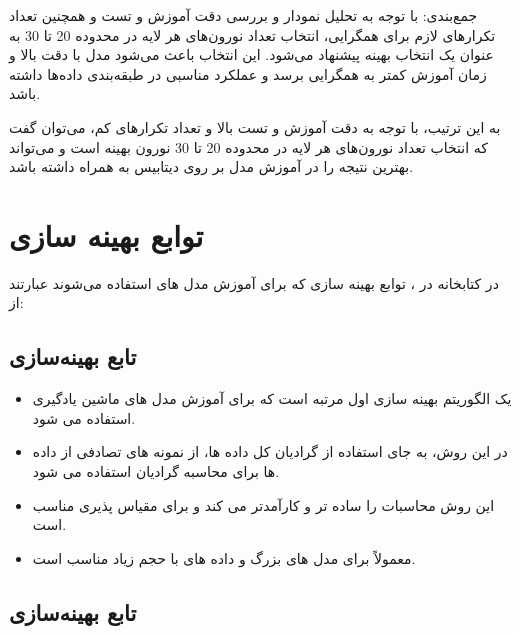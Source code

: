 \documentclass[12pt, dvipsnames, svgnames, x11names,]{article}
\begin{document}
		جمع‌بندی:
		با توجه به تحلیل نمودار و بررسی دقت آموزش و تست و همچنین تعداد تکرارهای لازم برای همگرایی، انتخاب تعداد نورون‌های هر لایه در محدوده 20 تا 30 به عنوان یک انتخاب بهینه پیشنهاد می‌شود. این انتخاب باعث می‌شود مدل با دقت بالا و زمان آموزش کمتر به همگرایی برسد و عملکرد مناسبی در طبقه‌بندی داده‌ها داشته باشد.
		
		
		به این ترتیب، با توجه به دقت آموزش و تست بالا و تعداد تکرارهای کم، می‌توان گفت که انتخاب تعداد نورون‌های هر لایه در محدوده 20 تا 30 نورون بهینه است و می‌تواند بهترین نتیجه را در آموزش مدل  بر روی دیتابیس  به همراه داشته باشد.
	
	
	\section{توابع بهینه سازی}
		در کتابخانه  در ، توابع بهینه سازی که برای آموزش مدل های  استفاده می‌شوند عبارتند از:
		
		\subsection{تابع بهینه‌سازی }
		
			\begin{itemize}
				
				\item {} یک الگوریتم بهینه سازی اول مرتبه است که برای آموزش مدل های ماشین یادگیری استفاده می شود.
				
				\item در این روش، به جای استفاده از گرادیان کل داده ها، از نمونه های تصادفی از داده ها برای محاسبه گرادیان استفاده می شود.
				
				\item این روش محاسبات را ساده تر و کارآمدتر می کند و برای مقیاس پذیری مناسب است.
				
				\item {} معمولاً برای مدل های بزرگ و داده های با حجم زیاد مناسب است.
				
				
			\end{itemize}
			
			
		\subsection{تابع بهینه‌سازی }
		
\end{document}
